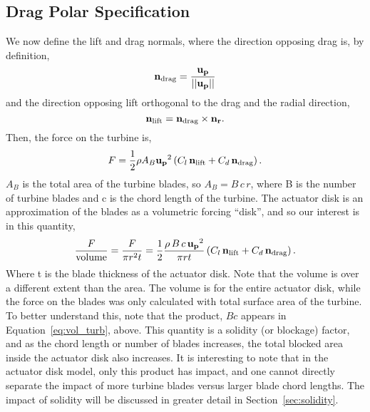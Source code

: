 \subsection{Drag Polar Specification}

We now define the lift and drag normals, where the direction opposing
drag is, by definition,  
\begin{equation}
{\bf n_{\text{drag}}} = \frac{{\bf u_p}}{||{\bf u_p}||} 
\end{equation}
and the direction opposing lift orthogonal to the drag and the radial 
direction,  
\begin{equation}
{\bf n_{\text{lift}}}= {\bf n_{\text{drag}}} \times {\bf n_r}. 
\end{equation}
%
Then, the force on the turbine is, 
\begin{equation}
 F = \frac{1}{2} \rho A_B {\bf u_p}^2 \left(C_l \,
					      {\bf n_\text{lift}} + C_d \,
					      {\bf n_\text{drag}}  \right).
\label{eq:force_turb}
\end{equation}
$A_B$ is the total area of the turbine blades, so $A_B = B\, c\, r$, where B
is the number of turbine blades and c is the chord length of the
turbine. 
The actuator disk is an approximation of the blades as a volumetric
forcing ``disk'', and so our interest is in this quantity,
\begin{equation}
\frac{F}{\text{volume}} = \frac{F}{\pi r^2 t} = \frac{1}{2}\frac{\rho\, B\, c\,
 {\bf u_p}^2}{\pi r t}\left(C_l \, {\bf n_\text{lift}} + C_d \, {\bf
		   n_\text{drag}} \right).  
\label{eq:vol_turb}
\end{equation}
Where t is the blade thickness of the actuator disk.
Note that the volume is over a different extent than the area. The
volume is for the entire actuator disk, while the force on the blades
was only calculated with total surface area of the turbine. 
To better understand this, note that the product, $B c$ appears in
Equation~\ref{eq:vol_turb}, above. This quantity is a solidity (or
blockage) factor, and as the chord length or number of blades increases,
the total blocked area inside the actuator disk also increases. It is
interesting to note that in the actuator disk model, only this product
has impact, and one cannot directly separate the impact of more turbine
blades versus larger blade chord lengths. 
The impact of solidity will be discussed in greater detail in
Section~\ref{sec:solidity}.


